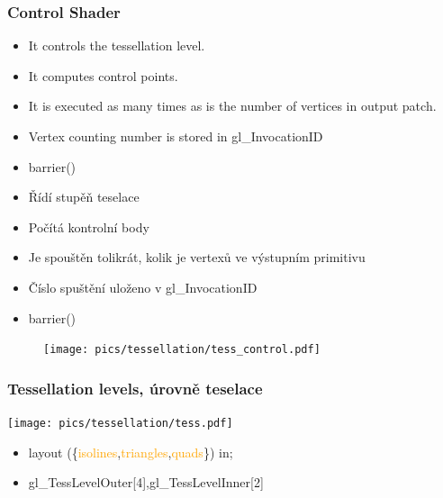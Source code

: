 \begin{frame}
\frametitle{Control Shader}
  \scriptsize
	\begin{itemize}
	\item It controls the tessellation level.
	\item It computes control points.
	\item It is executed as many times as is the number of vertices in output patch.
	\item Vertex counting number is stored in \textcolor{OliveGreen}{gl\_InvocationID}
	\item \textcolor{OliveGreen}{barrier}()
	\end{itemize}

	\begin{itemize}
	\item Řídí stupěň teselace
	\item Počítá kontrolní body
	\item Je spouštěn tolikrát, kolik je vertexů ve výstupním primitivu
	\item Číslo spuštění uloženo v \textcolor{OliveGreen}{gl\_InvocationID}
	\item \textcolor{OliveGreen}{barrier}()
	\end{itemize}
	\begin{figure}[h]
	\texttt{[image: pics/tessellation/tess\_control.pdf]}
	\end{figure}
\end{frame}

\begin{frame}
    \frametitle{Tessellation levels, úrovně teselace}

    \texttt{[image: pics/tessellation/tess.pdf]}

    \begin{itemize}
				\item \textcolor{OliveGreen}{layout}
					(\{\textcolor{orange}{isolines},\textcolor{orange}{triangles},\textcolor{orange}{quads}\})
					\textcolor{OliveGreen}{in};
				\item \textcolor{OliveGreen}{gl\_TessLevelOuter}[4],\textcolor{OliveGreen}{gl\_TessLevelInner}[2]
    \end{itemize}
\end{frame}

